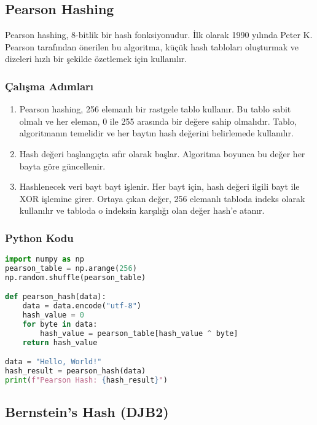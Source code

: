 \newpage

\subsection{Pearson Hashing}

Pearson hashing, 8-bitlik bir hash fonksiyonudur. İlk olarak 1990 yılında Peter K. Pearson tarafından önerilen bu algoritma, küçük hash tabloları oluşturmak ve dizeleri hızlı bir şekilde özetlemek için kullanılır. 

\subsubsection{Çalışma Adımları}

\begin{enumerate}
    \item Pearson hashing, 256 elemanlı bir rastgele tablo kullanır. Bu tablo sabit olmalı ve her eleman, 0 ile 255 arasında bir değere sahip olmalıdır. Tablo, algoritmanın temelidir ve her baytın hash değerini belirlemede kullanılır.
    \item Hash değeri başlangıçta sıfır olarak başlar. Algoritma boyunca bu değer her bayta göre güncellenir.
    \item Hashlenecek veri bayt bayt işlenir. Her bayt için, hash değeri ilgili bayt ile XOR işlemine girer. Ortaya çıkan değer, 256 elemanlı tabloda indeks olarak kullanılır ve tabloda o indeksin karşılığı olan değer hash'e atanır.
\end{enumerate}

\subsubsection{Python Kodu}

\begin{lstlisting}[language=Python]
import numpy as np
pearson_table = np.arange(256)
np.random.shuffle(pearson_table)

def pearson_hash(data):
    data = data.encode("utf-8")
    hash_value = 0
    for byte in data:
        hash_value = pearson_table[hash_value ^ byte]
    return hash_value

data = "Hello, World!"
hash_result = pearson_hash(data)
print(f"Pearson Hash: {hash_result}")
\end{lstlisting}

\newpage

\subsection{Bernstein's Hash (DJB2)}

